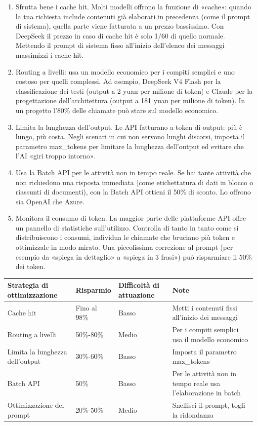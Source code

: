 \begin{enumerate}
  \item Sfrutta bene i cache hit. Molti modelli offrono la funzione di «cache»: quando la tua richiesta include contenuti già elaborati in precedenza (come il prompt di sistema), quella parte viene fatturata a un prezzo bassissimo. Con DeepSeek il prezzo in caso di cache hit è solo 1/60 di quello normale. Mettendo il prompt di sistema fisso all'inizio dell'elenco dei messaggi massimizzi i cache hit.
  \item Routing a livelli: usa un modello economico per i compiti semplici e uno costoso per quelli complessi. Ad esempio, DeepSeek V4 Flash per la classificazione dei testi (output a 2 yuan per milione di token) e Claude per la progettazione dell'architettura (output a 181 yuan per milione di token). In un progetto l'80\% delle chiamate può stare sul modello economico.
  \item Limita la lunghezza dell'output. Le API fatturano a token di output: più è lungo, più costa. Negli scenari in cui non servono lunghi discorsi, imposta il parametro max\_tokens per limitare la lunghezza dell'output ed evitare che l'AI «giri troppo intorno».
  \item Usa la Batch API per le attività non in tempo reale. Se hai tante attività che non richiedono una risposta immediata (come etichettatura di dati in blocco o riassunti di documenti), con la Batch API ottieni il 50\% di sconto. Lo offrono sia OpenAI che Azure.
  \item Monitora il consumo di token. La maggior parte delle piattaforme API offre un pannello di statistiche sull'utilizzo. Controlla di tanto in tanto come si distribuiscono i consumi, individua le chiamate che bruciano più token e ottimizzale in modo mirato. Una piccolissima correzione al prompt (per esempio da «spiega in dettaglio» a «spiega in 3 frasi») può risparmiare il 50\% dei token.
\end{enumerate}

\begin{center}
\begin{tabularx}{\linewidth}{|X|X|X|X|}
\hline
\textbf{Strategia di ottimizzazione} & \textbf{Risparmio} & \textbf{Difficoltà di attuazione} & \textbf{Note} \tabularnewline
\hline
Cache hit & Fino al 98\% & Basso & Metti i contenuti fissi all'inizio dei messaggi \tabularnewline
Routing a livelli & 50\%-80\% & Medio & Per i compiti semplici usa il modello economico \tabularnewline
Limita la lunghezza dell'output & 30\%-60\% & Basso & Imposta il parametro max\_tokens \tabularnewline
Batch API & 50\% & Basso & Per le attività non in tempo reale usa l'elaborazione in batch \tabularnewline
Ottimizzazione del prompt & 20\%-50\% & Medio & Snellisci il prompt, togli la ridondanza \tabularnewline
\hline
\end{tabularx}
\end{center}

